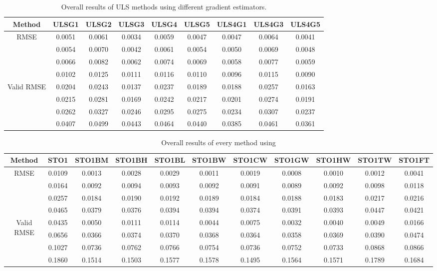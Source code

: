 \begin{table}[ht!]
\centering
\begin{tabular}{c|c|c|c|c|c|c|c|c}
Method & \scriptsize{ULSG1} & \scriptsize{ULSG2} & \scriptsize{ULSG3} & \scriptsize{ULSG4} & \scriptsize{ULSG5} & \scriptsize{ULS4G1} & \scriptsize{ULS4G3} & \scriptsize{ULS4G5}\\ \hline 
\multirow{4}{*}{RMSE} & 0.0051 & 0.0061 & 0.0034 & 0.0059 & 0.0047 & 0.0047 & 0.0064 & 0.0041 \\ 
 & 0.0054 & 0.0070 & 0.0042 & 0.0061 & 0.0054 & 0.0050 & 0.0069 & 0.0048 \\ 
 & 0.0066 & 0.0082 & 0.0062 & 0.0074 & 0.0069 & 0.0058 & 0.0077 & 0.0059 \\ 
 & 0.0102 & 0.0125 & 0.0111 & 0.0116 & 0.0110 & 0.0096 & 0.0115 & 0.0090 \\ 
 \hline
\multirow{4}{*}{Valid RMSE} & 0.0204 & 0.0243 & 0.0137 & 0.0237 & 0.0189 & 0.0188 & 0.0257 & 0.0163 \\ 
 & 0.0215 & 0.0281 & 0.0169 & 0.0242 & 0.0217 & 0.0201 & 0.0274 & 0.0191 \\ 
 & 0.0262 & 0.0327 & 0.0246 & 0.0295 & 0.0275 & 0.0234 & 0.0307 & 0.0237 \\ 
 & 0.0407 & 0.0499 & 0.0443 & 0.0464 & 0.0440 & 0.0385 & 0.0461 & 0.0361 \\ 
 \hline 
\end{tabular}
\caption{Overall results of ULS methods using different gradient estimators.}
\label{tab:ULS}
\end{table}


\begin{table}[ht!]
\centering
\begin{tabular}{c|c|c|c|c|c|c|c|c|c|c}
Method & \scriptsize{STO1} & \scriptsize{STO1BM} & \scriptsize{STO1BH} & \scriptsize{STO1BL} & \scriptsize{STO1BW} & \scriptsize{STO1CW} & \scriptsize{STO1GW} & \scriptsize{STO1HW} & \scriptsize{STO1TW} & \scriptsize{STO1FT}\\ \hline 
\multirow{4}{*}{RMSE} & 0.0109 & 0.0013 & 0.0028 & 0.0029 & 0.0011 & 0.0019 & 0.0008 & 0.0010 & 0.0012 & 0.0041 \\ 
 & 0.0164 & 0.0092 & 0.0094 & 0.0093 & 0.0092 & 0.0091 & 0.0089 & 0.0092 & 0.0098 & 0.0118 \\ 
 & 0.0257 & 0.0184 & 0.0190 & 0.0192 & 0.0189 & 0.0184 & 0.0188 & 0.0183 & 0.0217 & 0.0216 \\ 
 & 0.0465 & 0.0379 & 0.0376 & 0.0394 & 0.0394 & 0.0374 & 0.0391 & 0.0393 & 0.0447 & 0.0421 \\ 
 \hline
\multirow{4}{*}{Valid RMSE} & 0.0435 & 0.0050 & 0.0111 & 0.0114 & 0.0044 & 0.0075 & 0.0032 & 0.0040 & 0.0049 & 0.0166 \\ 
 & 0.0656 & 0.0366 & 0.0374 & 0.0370 & 0.0368 & 0.0364 & 0.0358 & 0.0369 & 0.0390 & 0.0474 \\ 
 & 0.1027 & 0.0736 & 0.0762 & 0.0766 & 0.0754 & 0.0736 & 0.0752 & 0.0733 & 0.0868 & 0.0866 \\ 
 & 0.1860 & 0.1514 & 0.1503 & 0.1577 & 0.1578 & 0.1495 & 0.1564 & 0.1571 & 0.1789 & 0.1684 \\ 
 \hline 
\end{tabular}
\caption{Overall results of every method using }
\label{tab:STO1}
\end{table}


